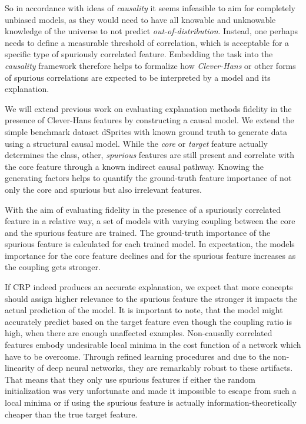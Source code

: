 So in accordance with ideas of \textit{causality} it seems infeasible to aim for completely unbiased models, as they would need to have all knowable and unknowable knowledge of the universe to not predict \textit{out-of-distribution}. 
Instead, one perhaps needs to define a measurable threshold of correlation, which is acceptable for a specific type of spuriously correlated feature. 
Embedding the task into the \textit{causality} framework therefore helps to formalize how \textit{Clever-Hans} or other forms of spurious correlations are expected to be interpreted by a model and its explanation.  

We will extend previous work on evaluating explanation methods fidelity in the presence of Clever-Hans features by constructing a causal model. We extend the simple benchmark dataset dSprites \cite{dsprites17} with known ground truth to generate data using a structural causal model.
While the \textit{core} or \textit{target} feature actually determines the class, other, \textit{spurious} features are still present and correlate with the core feature through a known indirect causal pathway.
Knowing the generating factors helps to quantify the ground-truth feature importance of not only the core and spurious but also irrelevant features.

With the aim of evaluating fidelity in the presence of a spuriously correlated feature in a relative way, a set of models with varying coupling between the core and the spurious feature are trained. The ground-truth importance of the spurious feature is calculated for each trained model. In expectation, the models importance for the core feature declines and for the spurious feature increases as the coupling gets stronger.

If CRP indeed produces an accurate explanation, we expect that more concepts should assign higher relevance to the spurious feature the stronger it impacts the actual prediction of the model. It is important to note, that the model might accurately predict based on the target feature even though the coupling ratio is high, when there are enough unaffected examples. Non-causally correlated features embody undesirable local minima in the cost function of a network which have to be overcome. Through refined learning procedures and due to the non-linearity of deep neural networks, they are remarkably robust to these artifacts. That means that they only use spurious features if either the random initialization was very unfortunate and made it impossible to escape from such a local minima or if using the spurious feature is actually information-theoretically cheaper than the true target feature. 

